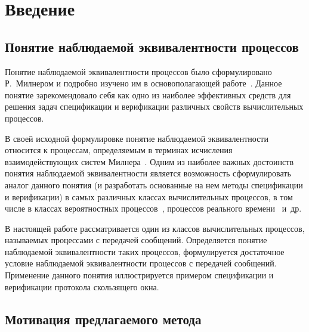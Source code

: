       \thispagestyle{headings}

      \begin{multicols}{2}

            \label{st\stat}

\section{Введение}

\subsection{Понятие наблюдаемой эквивалентности процессов}

Понятие наблюдаемой эквивалентности процессов было сформулировано
Р.~Милнером и подробно изучено им в основополагающей работе~\cite{1-mir}.
Данное понятие зарекомендовало себя как  одно из наиболее
эффективных средств для решения задач спецификации и верификации
различных свойств вычислительных процессов.

В своей исходной формулировке понятие наблюдаемой эквивалентности
относится к процессам, определяемым в терминах исчисления
взаимодействующих систем  Милнера~\cite{1-mir}. Одним из наиболее важных
достоинств понятия наблюда\-емой эквивалентности является возможность
сформулировать аналог данного понятия (и разработать основанные на
нем методы спецификации и верификации) в самых различных классах
вычислительных процессов, в том числе в классах вероятностных
процессов~\cite{larsen}, процессов реального времени~\cite{realtime}
и~др.

В настоящей работе  рассматривается один из классов вычислительных процессов,
называемых процессами с передачей сообщений.
Определяется понятие наблюдаемой эквивалентности таких
процессов, формулируется достаточное условие наблюдаемой эквивалентности процессов с передачей сообщений.
Применение данного понятия иллюстрируется примером
спецификации и верификации протокола скользящего окна.

\vspace*{-4pt}

\subsection{Мотивация предлагаемого метода}

\vspace*{-2pt}


\end{multicols}
